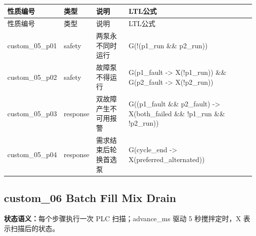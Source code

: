 \begin{longtable}{L{2.3cm}L{1.7cm}L{4.1cm}L{5.2cm}}

\toprule

性质编号 & 类型 & 说明 & LTL公式\\

\midrule

\endfirsthead

\toprule

性质编号 & 类型 & 说明 & LTL公式\\

\midrule

\endhead

{\ttfamily custom\_05\_p01} & safety & 两泵永不同时运行 & {\ttfamily G(!(p1\_run \&\& p2\_run))}\\

{\ttfamily custom\_05\_p02} & safety & 故障泵不得运行 & {\ttfamily G(p1\_fault -> X(!p1\_run)) \&\& G(p2\_fault -> X(!p2\_run))}\\

{\ttfamily custom\_05\_p03} & response & 双故障产生不可用报警 & {\ttfamily G((p1\_fault \&\& p2\_fault) -> X(both\_failed \&\& !p1\_run \&\& !p2\_run))}\\

{\ttfamily custom\_05\_p04} & response & 需求结束后轮换首选泵 & {\ttfamily G(cycle\_end -> X(preferred\_alternated))}\\

\bottomrule

\end{longtable}

\subsection{{\ttfamily custom\_06} Batch Fill Mix Drain}

\noindent\textbf{状态语义：}每个步骤执行一次 PLC 扫描；advance\_ms 驱动 5 秒搅拌定时，X 表示扫描后的状态。

